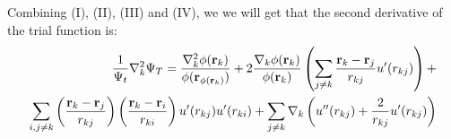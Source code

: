 \documentclass[a4paper, 10pt]{article}
\begin{document}
Combining (I), (II), (III) and (IV), we we will get that the second derivative
of the trial function is:
\begin{align}
  \begin{split}
  \frac{1}{\Psi_{t}}\nabla_{k}^2\Psi_{T} =
  \frac{\nabla_{k}^2\phi{(\bold{r}_{k})}}{\phi(\bold{r}_{\phi(\bold{r}_{k})})}
  +
  2\frac{\nabla_{k}\phi(\bold{r}_{k})}{\phi{(\bold{r}_{k})}}\left(\sum_{j\neq k}\frac{\bold{r}_{k} - \bold{r}_{j}}{r_{kj}}u'(r_{kj})\right)
  +\\
  \sum_{i, j\neq k}\left(\frac{\bold{r}_{k} - \bold{r}_{j}}{r_{kj}}\right)
  \left(\frac{\bold{r}_{k} - \bold{r}_{i}}{r_{ki}}\right)u'(r_{kj})u'(r_{ki})
  +
  \sum_{j \neq k}\nabla_{k}\left(u''(r_{kj}) + \frac{2}{r_{kj}}u'(r_{kj})\right)
\end{split}
\end{align}
\end{document}
